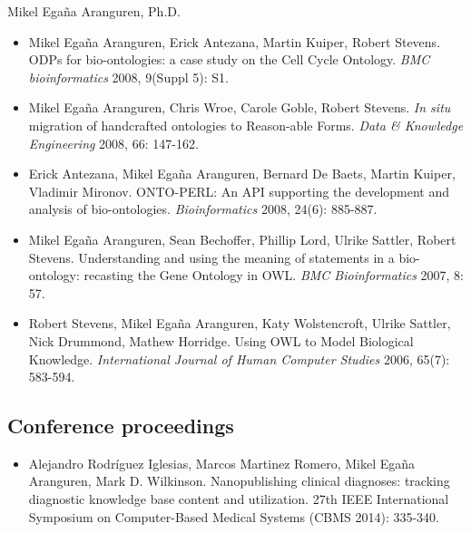 \documentclass[english,11pt,a4paper,oneside]{article}
\begin{document}
\begin{cv}{Mikel Ega\~na Aranguren, Ph.D. }
\begin{itemize}
\item Mikel Ega\~na Aranguren, Erick Antezana, Martin Kuiper, Robert Stevens. ODPs for bio-ontologies: a case study on the Cell Cycle Ontology. \textit{BMC bioinformatics} 2008, 9(Suppl 5): S1. 

\item Mikel Ega\~na Aranguren, Chris Wroe, Carole Goble, Robert Stevens. \textit{In situ} migration of handcrafted ontologies to Reason-able Forms. \textit{Data \& Knowledge Engineering} 2008, 66: 147-162.

\item Erick Antezana, Mikel Ega\~na Aranguren, Bernard De Baets, Martin Kuiper, Vladimir Mironov. ONTO-PERL: An API supporting the development and analysis of bio-ontologies. \textit{Bioinformatics} 2008, 24(6): 885-887.	

\item Mikel Ega\~na Aranguren, Sean Bechoffer, Phillip Lord, Ulrike Sattler, Robert Stevens. Understanding and using the meaning of statements in a bio-ontology: recasting the Gene Ontology in OWL. \textit{BMC Bioinformatics} 2007, 8: 57. 

\item Robert Stevens, Mikel Ega\~na Aranguren, Katy Wolstencroft, Ulrike Sattler, Nick Drummond, Mathew Horridge. Using OWL to Model Biological Knowledge. \textit{International Journal of Human Computer Studies} 2006, 65(7): 583-594.
\end{itemize}

\subsection*{Conference proceedings}





\begin{itemize}
       
       \item  Alejandro Rodr\'iguez Iglesias, Marcos Martinez Romero, Mikel Ega\~na Aranguren, Mark D. Wilkinson. Nanopublishing clinical diagnoses: tracking diagnostic knowledge base content and utilization. 27th IEEE International Symposium on Computer-Based Medical Systems (CBMS 2014): 335-340.


\end{itemize}
\end{cv}
\end{document}
